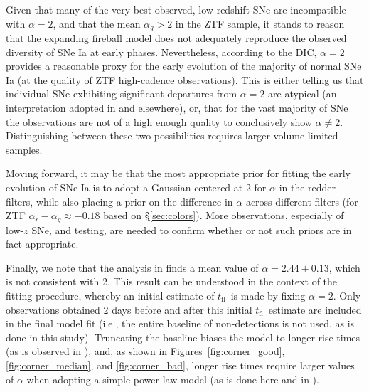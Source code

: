 \documentclass[twocolumn]{aastex63}
\newcommand{\tfl}{$t_\mathrm{fl}$}
\begin{document}
Given that many of the very best-observed, low-redshift SNe are incompatible
with $\alpha = 2$, and that the mean $\alpha_g > 2$ in the ZTF sample, it stands
to reason that the expanding fireball model does not adequately reproduce the
observed diversity of SNe Ia at early phases. Nevertheless, according to the
DIC, $\alpha=2$ provides a reasonable proxy for the early evolution of the
majority of normal SNe\,Ia (at the quality of ZTF high-cadence observations).
This is either telling us that individual SNe exhibiting significant
departures from $\alpha = 2$ are atypical (an interpretation adopted in
\citealt{Hosseinzadeh17,Miller18,Dimitriadis19} and elsewhere), or, that for
the vast majority of SNe the observations are not of a high enough quality to
conclusively show $\alpha \neq 2$. Distinguishing between these two
possibilities requires larger volume-limited samples.

Moving forward, it may be that the most appropriate prior for fitting the
early evolution of SNe Ia is to adopt a Gaussian centered at 2 for $\alpha$ in
the redder filters, while also placing a prior on the difference in $\alpha$
across different filters (for ZTF $\alpha_r - \alpha_g \approx -0.18$ based on
\S\ref{sec:colors}). More observations, especially of low-$z$ SNe, and
testing, are needed to confirm whether or not such priors are in fact
appropriate.

Finally, we note that the analysis in \citet{Firth15} finds a mean value of
$\alpha = 2.44 \pm 0.13$, which is not consistent with 2. This result can be
understood in the context of the \citet{Firth15} fitting procedure, whereby an
initial estimate of \tfl\ is made by fixing $\alpha = 2$. Only observations
obtained 2 days before and after this initial \tfl\ estimate are included in
the final model fit (i.e., the entire baseline of non-detections is not used,
as is done in this study). Truncating the baseline biases the model to longer
rise times (as is observed in \citealt{Firth15}), and, as shown in
Figures~\ref{fig:corner_good}, \ref{fig:corner_median}, and
\ref{fig:corner_bad}, longer rise times require larger values of $\alpha$ when
adopting a simple power-law model (as is done here and in \citet{Firth15}).
\end{document}
